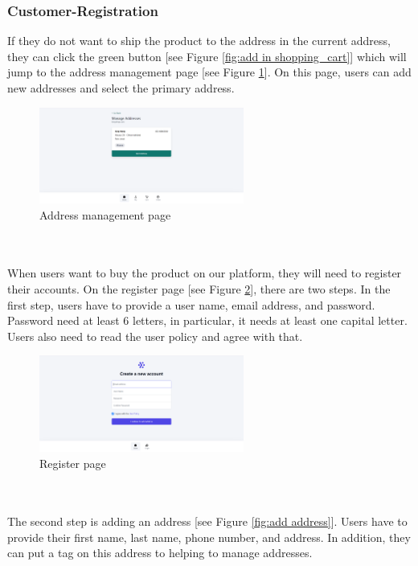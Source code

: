 \documentclass{article}
\begin{document}
\subsubsection{Customer-Registration}
If they do not want to ship the product to the address in the current address, they can click the green button [see Figure \ref{fig:add in shopping_cart}] which will jump to the address management page [see Figure \ref{fig:manage address}]. On this page, users can add new addresses and select the primary address.
\begin{figure}[!htp]
    \centering
    \includegraphics[width=0.6\textwidth]{manage address.png}
    \caption{\label{fig:manage address} Address management page}
\end{figure}
\\\\
When users want to buy the product on our platform, they will need to register their accounts. On the register page [see Figure \ref{fig:register}], there are two steps. In the first step, users have to provide a user name, email address, and password. Password need at least 6 letters, in particular, it needs at least one capital letter. Users also need to read the user policy and agree with that.  
\begin{figure}[!htp]
    \centering
    \includegraphics[width=0.6\textwidth]{register.png}
    \caption{\label{fig:register}Register page}
\end{figure}
\\\\
The second step is adding an address [see Figure \ref{fig:add address}]. Users have to provide their first name, last name, phone number, and address. In addition, they can put a tag on this address to helping to manage addresses.
\end{document}
